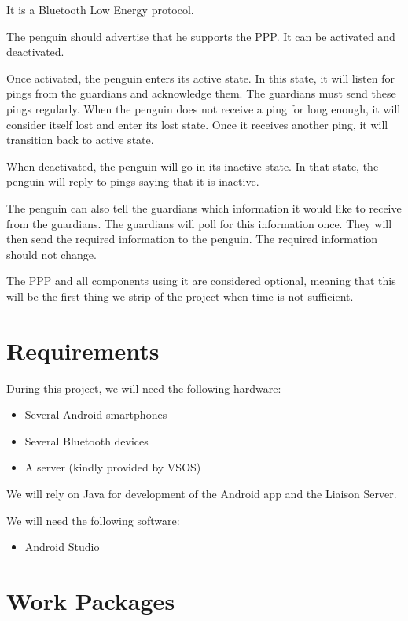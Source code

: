 \documentclass{report}
\begin{document}
It is a Bluetooth Low Energy protocol.

The penguin should advertise that he supports the PPP. It can be activated and deactivated.

Once activated, the penguin enters its active state. In this state, it will listen for pings from the guardians and acknowledge them. The guardians must send these pings regularly. When the penguin does not receive a ping for long enough, it will consider itself lost and enter its lost state. Once it receives another ping, it will transition back to active state.

When deactivated, the penguin will go in its inactive state. In that state, the penguin will reply to pings saying that it is inactive.

The penguin can also tell the guardians which information it would like to receive from the guardians. The guardians will poll for this information once. They will then send the required information to the penguin. The required information should not change.

The PPP and all components using it are considered optional, meaning that this will be the first thing we strip of the project when time is not sufficient.

\section{Requirements}

During this project, we will need the following hardware:

\begin{itemize}
    \item Several Android smartphones
    \item Several Bluetooth devices
    \item A server (kindly provided by VSOS)
\end{itemize}

We will rely on Java for development of the Android app and the Liaison Server.

We will need the following software:

\begin{itemize}
    \item Android Studio
\end{itemize}


\section{Work Packages}
\end{document}
